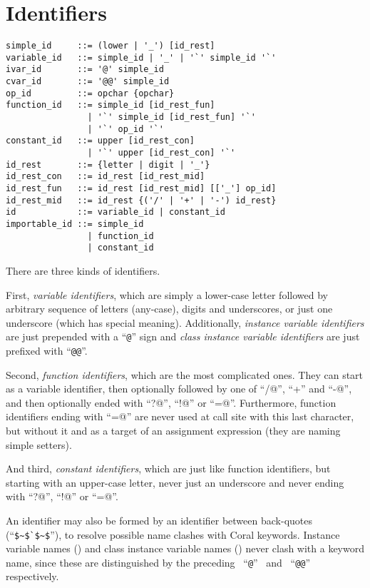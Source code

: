 \newpage

\section{Identifiers}
\label{sec:identifiers}

\syntax\begin{lstlisting}
simple_id     ::= (lower | '_') [id_rest]
variable_id   ::= simple_id | '_' | '`' simple_id '`'
ivar_id       ::= '@' simple_id
cvar_id       ::= '@@' simple_id
op_id         ::= opchar {opchar}
function_id   ::= simple_id [id_rest_fun]
                | '`' simple_id [id_rest_fun] '`'
                | '`' op_id '`'
constant_id   ::= upper [id_rest_con]
                | '`' upper [id_rest_con] '`'
id_rest       ::= {letter | digit | '_'}
id_rest_con   ::= id_rest [id_rest_mid]
id_rest_fun   ::= id_rest [id_rest_mid] [['_'] op_id]
id_rest_mid   ::= id_rest {('/' | '+' | '-') id_rest}
id            ::= variable_id | constant_id
importable_id ::= simple_id
                | function_id
                | constant_id
\end{lstlisting}

There are three kinds of identifiers.

First, \textit{variable identifiers}, which are simply a lower-case letter followed by arbitrary sequence of letters (any-case), digits and underscores, or just one underscore (which has special meaning). Additionally, \textit{instance variable identifiers} are just prepended with a ``\lstinline|@|'' sign and \textit{class instance variable identifiers} are just prefixed with ``\lstinline|@@|''. 

Second, \textit{function identifiers}, which are the most complicated ones. They can start as a variable identifier, then optionally followed by one of ``\lstinline@/@'', ``+'' and ``\lstinline@-@'', and then optionally ended with ``\lstinline@?@'', ``\lstinline@!@'' or ``\lstinline@=@''. Furthermore, function identifiers ending with ``\lstinline@=@'' are never used at call site with this last character, but without it and as a target of an assignment expression (they are naming simple setters). 

And third, \textit{constant identifiers}, which are just like function identifiers, but starting with an upper-case letter, never just an underscore and never ending with ``\lstinline@?@'', ``\lstinline@!@'' or ``\lstinline@=@''.

An identifier may also be formed by an identifier between back-quotes (``\lstinline!$~$`$~$!''), to resolve possible name clashes with Coral keywords. Instance variable names () and class instance variable names () never clash with a keyword name, since these are distinguished by the preceding ~``\lstinline!@!''~ and ~``\lstinline!@@!''~ respectively. 

